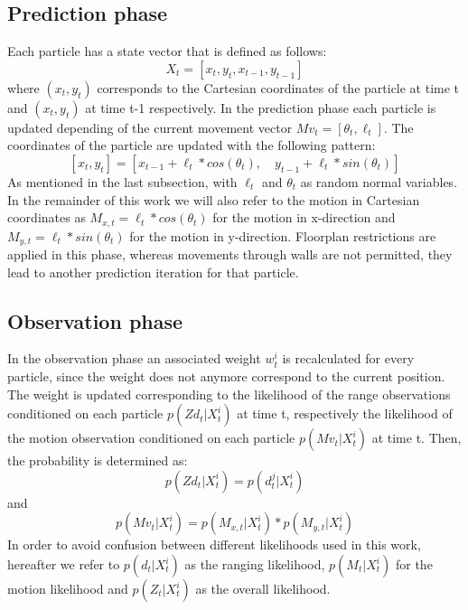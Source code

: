 \subsection{Prediction phase}
Each particle has a state vector that is defined as follows:
$$X_{t} = [x_{t}, y_{t}, x_{t-1}, y_{t-1}]$$
where $(x_{t}, y_{t})$ corresponds to the Cartesian coordinates of the particle at time t and $(x_{t}, y_{t})$ at time t-1 respectively. In the prediction phase each particle is updated depending of the current movement vector $Mv_{t} = [\theta_{t}, \ell_{t}]$. The coordinates of the particle are updated with the following pattern:
$$[x_{t}, y_{t}]  = [x_{t-1} + \ell_{t} * cos(\theta_{t}),\quad y_{t-1} + \ell_{t} * sin(\theta_{t})]$$
As mentioned in the last subsection, with $\ell_{t}$ and $\theta_{t}$ as random normal variables. In the remainder of this work we will also refer to the motion in Cartesian coordinates as $M_{x,t} = \ell_{t} * cos(\theta_{t})$ for the motion in x-direction and $M_{y,t} = \ell_{t} * sin(\theta_{t})$ for the motion in y-direction.
Floorplan restrictions are applied in this phase, whereas movements through walls are not permitted, they lead to another prediction iteration for that particle.

\subsection{Observation phase}
In the observation phase an associated weight $w^{i}_{t}$ is recalculated for every particle, since the weight does not anymore correspond to the current position. The weight is updated corresponding to the likelihood of the range observations conditioned on each particle $p(Zd_{t} | X^{i}_{t})$ at time t, respectively the likelihood of the motion observation conditioned on each particle $p(Mv_{t} | X^{i}_{t})$ at time t. Then, the probability is determined as:
$$ p(Zd_{t} | X^{i}_{t}) = p(d_{t}^{j} | X^{i}_{t}) $$
and $$ p(Mv_{t} | X^{i}_{t}) = p(M_{x,t} | X^{i}_{t}) * p(M_{y,t} | X^{i}_{t})$$ %
In order to avoid confusion between different likelihoods used in this work, hereafter we refer to $p(d_{t} | X^{i}_{t})$ as the ranging likelihood, $p(M_{t} | X^{i}_{t})$ for the motion likelihood and $p(Z_{t} | X^{i}_{t})$ as the overall likelihood.

